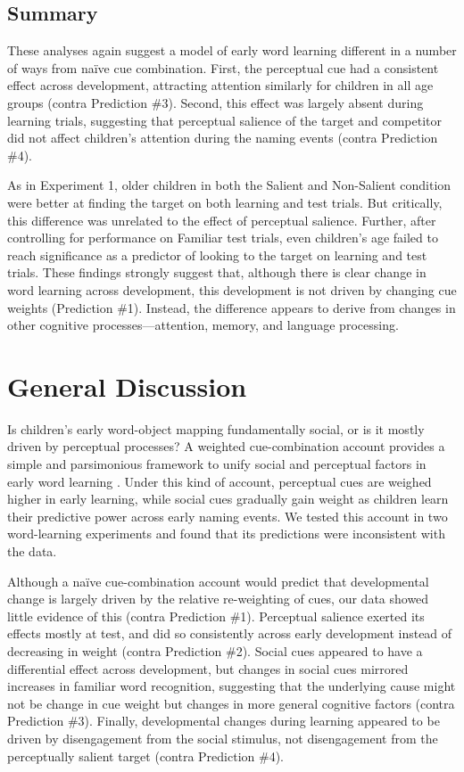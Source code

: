 \documentclass[man,floatsintext]{apa6}
\begin{document}
\subsection{Summary}

These analyses again suggest a model of early word learning different in a number of ways from na\"{i}ve cue combination. First, the perceptual cue had a consistent effect across development, attracting attention similarly for children in all age groups (contra Prediction \#3). Second, this effect was largely absent during learning trials, suggesting that perceptual salience of the target and competitor did not affect children's attention during the naming events (contra Prediction \#4). 

As in Experiment 1, older children in both the Salient and Non-Salient condition were better at finding the target on both learning and test trials. But critically, this difference was unrelated to the effect of perceptual salience. Further, after controlling for performance on Familiar test trials, even children's age failed to reach significance as a predictor of looking to the target on learning and test trials. These findings strongly suggest that, although there is clear change in word learning across development, this development is not driven by changing cue weights (Prediction \#1). Instead, the difference appears to derive from changes in other cognitive processes---attention, memory, and language processing.

\section{General Discussion}

Is children's early word-object mapping fundamentally social, or is it mostly driven by perceptual processes? A weighted cue-combination account provides a simple and parsimonious framework to unify social and perceptual factors in early word learning \cite{Hollich2000,Yu2007b,Frank2013a}. Under this kind of account, perceptual cues are weighed higher in early learning, while social cues gradually gain weight as children learn their predictive power across early naming events. We tested this account in two word-learning experiments and found that its predictions were inconsistent with the data. 

Although a na\"{i}ve cue-combination account would predict that developmental change is largely driven by the relative re-weighting of cues, our data showed little evidence of this (contra Prediction \#1). Perceptual salience exerted its effects mostly at test, and did so consistently across early development instead of decreasing in weight (contra Prediction \#2). Social cues appeared to have a differential effect across development, but changes in social cues mirrored increases in familiar word recognition, suggesting that the underlying cause might not be change in cue weight but changes in more general cognitive factors (contra Prediction \#3). Finally, developmental changes during learning appeared to be driven by disengagement from the social stimulus, not disengagement from the perceptually salient target (contra Prediction \#4). 
\end{document}
